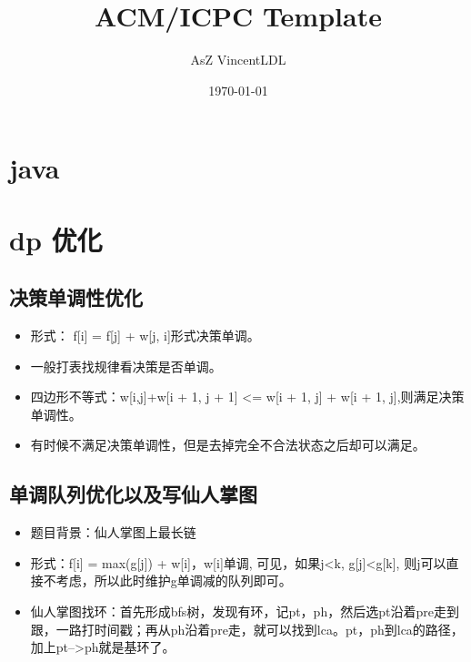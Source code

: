 \documentclass[landscape]{report}
\newcommand{\includecode}[2][c]{}
\begin{document}
 
\begin{flushleft}

\dominitoc[n]
\title{ACM/ICPC Template}
\author{AsZ VincentLDL}
\date{\today}
\maketitle
\setcounter{secnumdepth}{3}
\tableofcontents
\newpage
\begin{multicols}{2}
\chapter{ java}
\includecode[java]{Main.java}
\chapter{ dp 优化}
\section{ 决策单调性优化}
\begin{itemize}
\item 形式： f[i] = f[j] + w[j, i]形式决策单调。
\item 一般打表找规律看决策是否单调。
\item 四边形不等式：w[i,j]+w[i + 1, j + 1] <= w[i + 1, j] + w[i + 1, j],则满足决策单调性。
\item 有时候不满足决策单调性，但是去掉完全不合法状态之后却可以满足。
\end{itemize}
 \includecode[c++]{hnoi2008toys.cpp}   

\section{ 单调队列优化以及写仙人掌图}
\begin{itemize}
\item 题目背景：仙人掌图上最长链
\item 形式：f[i] = max(g[j]) + w[i]，w[i]单调, 可见，如果j<k, g[j]<g[k], 则j可以直接不考虑，所以此时维护g单调减的队列即可。
\item 仙人掌图找环：首先形成bfs树，发现有环，记pt，ph，然后选pt沿着pre走到跟，一路打时间戳；再从ph沿着pre走，就可以找到lca。pt，ph到lca的路径，加上pt-->ph就是基环了。
\end{itemize}
\includecode[c++]{ioi2008Island.cpp}

\end{multicols}
\end{flushleft}
\end{document}
